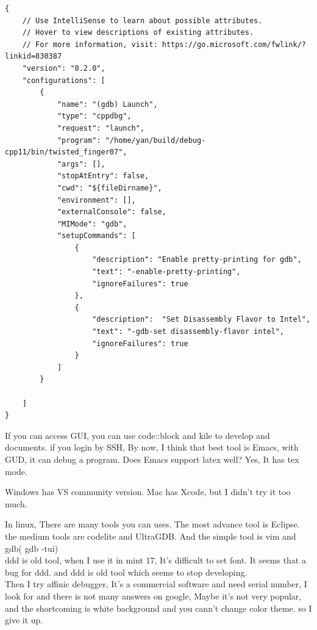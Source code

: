 \documentclass[a4paper,11pt,twoside]{book}
\begin{document}
\begin{itemize}
\begin{lstlisting}[mathescape=false]
{
    // Use IntelliSense to learn about possible attributes.
    // Hover to view descriptions of existing attributes.
    // For more information, visit: https://go.microsoft.com/fwlink/?linkid=830387
    "version": "0.2.0",
    "configurations": [
        {
            "name": "(gdb) Launch",
            "type": "cppdbg",
            "request": "launch",
            "program": "/home/yan/build/debug-cpp11/bin/twisted_finger07",
            "args": [],
            "stopAtEntry": false,
            "cwd": "${fileDirname}",
            "environment": [],
            "externalConsole": false,
            "MIMode": "gdb",
            "setupCommands": [
                {
                    "description": "Enable pretty-printing for gdb",
                    "text": "-enable-pretty-printing",
                    "ignoreFailures": true
                },
                {
                    "description":  "Set Disassembly Flavor to Intel",
                    "text": "-gdb-set disassembly-flavor intel",
                    "ignoreFailures": true
                }
            ]
        }

    ]
}
\end{lstlisting}
\end{itemize}
If you can access GUI, you can use code::block and kile to develop and documents. if
you login by SSH, By now, I think that best tool is Emacs, with GUD, it can debug a
program. Does Emacs support latex well? Yes, It has tex mode. \par

Windows has VS community version.  Mac has Xcode, but I didn't try it too much. 

In linux, There are many tools you can uses. The most advance tool is Eclipse. the medium tools are codelite and UltraGDB. And the simple tool is vim and gdb( gdb -tui) \\

ddd is old tool, when I use it in mint 17, It's difficult to set font.  It seems that a bug for ddd. and ddd is old tool which seems to stop developing.  \\

Then I try affinic debugger, It's a commercial software and need serial number, I look for and there is not many answers on google, Maybe it's not very popular,  and the shortcoming is white background and you cann't change color theme. so I give it up. \\
\end{document}
